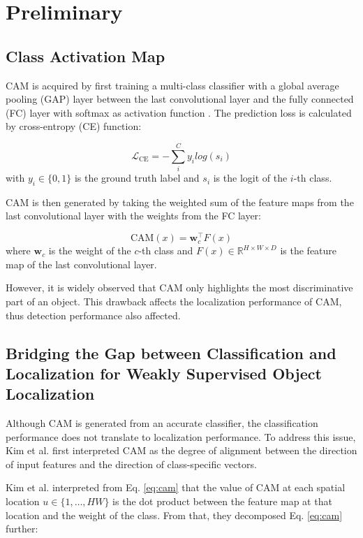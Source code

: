 \documentclass[conference]{IEEEtran}
\begin{document}
\section{Preliminary}
\subsection{Class Activation Map}
CAM is acquired by first training a multi-class classifier with a global average pooling (GAP) layer between the last convolutional layer and the fully connected (FC) layer with softmax as activation function \cite{zhou2015cnnlocalization}. The prediction loss is calculated by cross-entropy (CE) function:

\begin{equation}\label{eq:ce_loss}
    \mathcal{L}_{\text{CE}}=-\sum_{i}^{C}{y_i log(s_i)}
\end{equation}
with $y_i \in \{0, 1\}$ is the ground truth label and $s_i$ is the logit of the $i$-th class.

CAM is then generated by taking the weighted sum of the feature maps from the last convolutional layer with the weights from the FC layer:

\begin{equation}\label{eq:cam}
    \text{CAM}(x)=\mathbf{w}_c^{\boldsymbol{\top}} F(x)
\end{equation}
where $\mathbf{w}_c$ is the weight of the $c$-th class and $F(x) \in \mathbb{R}^{H \times W \times D}$ is the feature map of the last convolutional layer.

However, it is widely observed that CAM only highlights the most discriminative part of an object. This drawback affects the localization performance of CAM, thus detection performance also affected.


\subsection{Bridging the Gap between Classification and Localization for Weakly Supervised Object Localization}
Although CAM is generated from an accurate classifier, the classification performance does not translate to localization performance. To address this issue, Kim et al. \cite{kim2022bridging} first interpreted CAM as the degree of alignment between the direction of input features and the direction of class-specific vectors.

Kim et al. interpreted from Eq. \ref{eq:cam} that the value of CAM at each spatial location $u \in \{1, \dots, HW\}$ is the dot product between the feature map at that location and the weight of the class. From that, they decomposed Eq. \ref{eq:cam} further:
\end{document}
